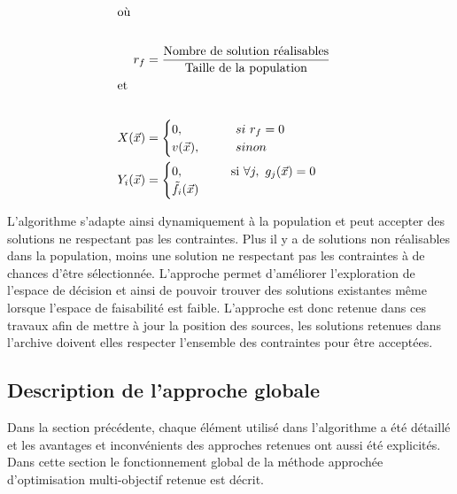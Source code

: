 \begin{align*}
  \shortintertext{où} \\
    r_{f} &= \frac{\text{Nombre de solution réalisables}}{\text{Taille de la population}} \\
  \shortintertext{et} \\
  X(\vec{x})     &= \begin{cases}
                0,          \qquad     & si\  r_{f} = 0\\
                v(\vec{x}), \qquad     & sinon\\
                \end{cases} \\
  Y_{i}(\vec{x}) &= \begin{cases}
                    0,          \quad \qquad & \text{si} \ \forall j, \ g_{j}(\vec{x}) = 0\\
                      \tilde{f}_{i}(\vec{x})  \\
            \end{cases}\\
\end{align*}

L’algorithme s’adapte ainsi dynamiquement à la population et peut accepter des
solutions ne respectant pas les contraintes. Plus il y a de solutions non
réalisables dans la population, moins une solution ne respectant pas les contraintes à
de chances d’être sélectionnée. L’approche permet d’améliorer l’exploration de
l’espace de décision et ainsi de pouvoir trouver des solutions existantes même
lorsque l’espace de faisabilité est faible.
L’approche est donc retenue dans ces travaux afin de mettre à jour la position des
sources, les solutions retenues dans l’archive doivent elles respecter
l’ensemble des contraintes pour être acceptées.


\subsection{Description de l’approche globale} %
\label{sub:description_de_l_approche_globale}
Dans la section précédente, chaque élément utilisé dans l’algorithme a été détaillé et
les avantages et inconvénients des approches retenues ont aussi été explicités.
Dans cette section le fonctionnement global de la méthode approchée d’optimisation
multi-objectif retenue est décrit.

